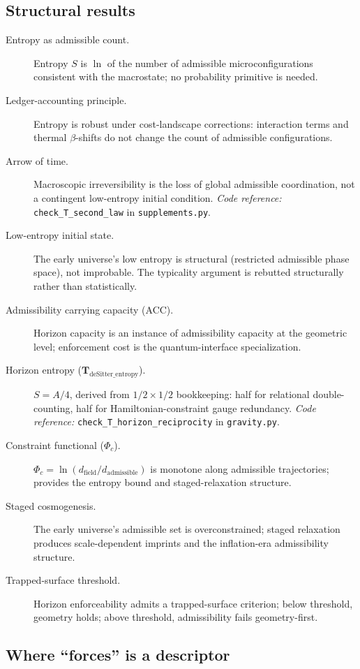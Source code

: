 \documentclass[11pt]{article}
\newcommand{\coderef}[2]{\smallskip\noindent\textit{Code reference:} \texttt{#1} in \texttt{#2}.}
\begin{document}
\subsection{Structural results}\label{sec:P3_results}

\begin{description}
    \item[Entropy as admissible count.] Entropy $S$ is $\ln$ of the number of admissible microconfigurations consistent with the macrostate; no probability primitive is needed.
    \item[Ledger-accounting principle.] Entropy is robust under cost-landscape corrections: interaction terms and thermal $\beta$-shifts do not change the count of admissible configurations.
    \item[Arrow of time.] Macroscopic irreversibility is the loss of global admissible coordination, not a contingent low-entropy initial condition. \coderef{check\_T\_second\_law}{supplements.py}
    \item[Low-entropy initial state.] The early universe's low entropy is structural (restricted admissible phase space), not improbable. The typicality argument is rebutted structurally rather than statistically.
    \item[Admissibility carrying capacity (ACC).] Horizon capacity is an instance of admissibility capacity at the geometric level; enforcement cost is the quantum-interface specialization.
    \item[Horizon entropy ($\mathbf{T}_{\mathrm{deSitter\_entropy}}$).] $S = A/4$, derived from $1/2 \times 1/2$ bookkeeping: half for relational double-counting, half for Hamiltonian-constraint gauge redundancy. \coderef{check\_T\_horizon\_reciprocity}{gravity.py}
    \item[Constraint functional ($\Phi_c$).] $\Phi_c = \ln(d_{\mathrm{field}}/d_{\mathrm{admissible}})$ is monotone along admissible trajectories; provides the entropy bound and staged-relaxation structure.
    \item[Staged cosmogenesis.] The early universe's admissible set is overconstrained; staged relaxation produces scale-dependent imprints and the inflation-era admissibility structure.
    \item[Trapped-surface threshold.] Horizon enforceability admits a trapped-surface criterion; below threshold, geometry holds; above threshold, admissibility fails geometry-first.
\end{description}

\subsection{Where ``forces'' is a descriptor}\label{sec:P3_forces}
\end{document}

